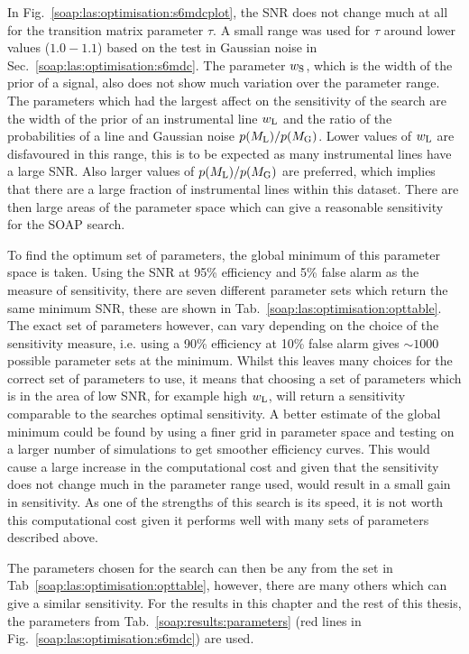 In Fig.~\ref{soap:las:optimisation:s6mdcplot}, the \gls{SNR} does not change much at all for the transition matrix parameter $\tau$.
A small range was used for $\tau$ around lower values ($1.0 - 1.1$) based on the test in Gaussian noise in Sec.~\ref{soap:las:optimisation:s6mdc}. 
The parameter $w_{\rm{S}}$, which is the width of the prior of a signal, also does not show much variation over the parameter range. 
The parameters which had the largest affect on the sensitivity of the search are the width of the prior of an instrumental line $w_{\rm{L}}$ and the ratio of the probabilities of a line and Gaussian noise $p(M_{\rm{L}})/p(M_{\rm{G}})$.
Lower values of $w_{\rm{L}}$ are disfavoured in this range, this is to be expected as many instrumental lines have a large \gls{SNR}.
Also larger values of $p(M_{\rm{L}})/p(M_{\rm{G}})$ are preferred, which implies that there are a large fraction of instrumental lines within this dataset.
There are then large areas of the parameter space which can give a reasonable sensitivity for the SOAP search.

To find the optimum set of parameters, the global minimum of this parameter space is taken.
Using the \gls{SNR} at 95\% efficiency and 5\% false alarm as the measure of sensitivity, there are seven different parameter sets which return the same minimum \gls{SNR}, these are shown in Tab.~\ref{soap:las:optimisation:opttable}.
The exact set of parameters however, can vary depending on the choice of the sensitivity measure, i.e. using a 90\% efficiency at 10\% false alarm gives $\sim 1000$ possible parameter sets at the minimum.
Whilst this leaves many choices for the correct set of parameters to use, it means that choosing a set of parameters which is in the area of low \gls{SNR}, for example high $w_{\rm{L}}$, will return a sensitivity comparable to the searches optimal sensitivity.
A better estimate of the global minimum could be found by using a finer grid in parameter space and testing on a larger number of simulations to get smoother efficiency curves.
This would cause a large increase in the computational cost and given that the sensitivity does not change much in the parameter range used, would result in a small gain in sensitivity. As one of the strengths of this search is its speed, it is not worth this computational cost given it performs well with many sets of parameters described above.

The parameters chosen for the search can then be any from the set in Tab~\ref{soap:las:optimisation:opttable}, however, there are many others which can give a similar sensitivity. 
For the results in this chapter and the rest of this thesis, the parameters from Tab.~\ref{soap:results:parameters} (red lines in Fig.~\ref{soap:las:optimisation:s6mdc}) are used. 


